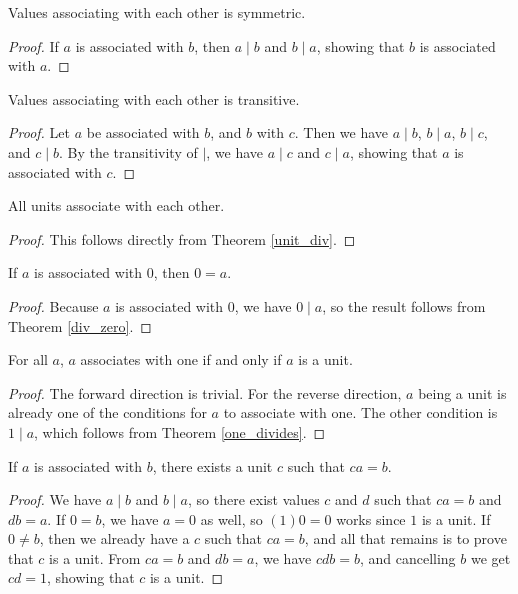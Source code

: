 \documentclass[../../math.tex]{subfiles}
\begin{document}
\begin{instance}
    Values associating with each other is symmetric.
\end{instance}
\begin{proof}
    If $a$ is associated with $b$, then $a \mid b$ and $b \mid a$, showing that
    $b$ is associated with $a$.
\end{proof}

\begin{instance}
    Values associating with each other is transitive.
\end{instance}
\begin{proof}
    Let $a$ be associated with $b$, and $b$ with $c$.  Then we have $a \mid b$,
    $b \mid a$, $b \mid c$, and $c \mid b$.  By the transitivity of $\mid$, we
    have $a \mid c$ and $c \mid a$, showing that $a$ is associated with $c$.
\end{proof}

\begin{theorem} \label{unit_associates}
    All units associate with each other.
\end{theorem}
\begin{proof}
    This follows directly from Theorem \ref{unit_div}.
\end{proof}

\begin{theorem} \label{associates_zero}
    If $a$ is associated with $0$, then $0 = a$.
\end{theorem}
\begin{proof}
    Because $a$ is associated with $0$, we have $0 \mid a$, so the result
    follows from Theorem \ref{div_zero}.
\end{proof}

\begin{theorem} \label{associates_one}
    For all $a$, $a$ associates with one if and only if $a$ is a unit.
\end{theorem}
\begin{proof}
    The forward direction is trivial.  For the reverse direction, $a$ being a
    unit is already one of the conditions for $a$ to associate with one.  The
    other condition is $1 \mid a$, which follows from Theorem \ref{one_divides}.
\end{proof}

\begin{theorem} \label{associates_unit}
    If $a$ is associated with $b$, there exists a unit $c$ such that $ca = b$.
\end{theorem}
\begin{proof}
    We have $a \mid b$ and $b \mid a$, so there exist values $c$ and $d$ such
    that $ca = b$ and $db = a$.  If $0 = b$, we have $a = 0$ as well, so $(1)0 =
    0$ works since $1$ is a unit.  If $0 \neq b$, then we already have a $c$
    such that $ca = b$, and all that remains is to prove that $c$ is a unit.
    From $ca = b$ and $db = a$, we have $cdb = b$, and cancelling $b$ we get $cd
    = 1$, showing that $c$ is a unit.
\end{proof}
\end{document}
